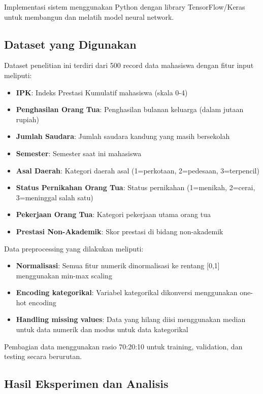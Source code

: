 \documentclass[10pt,a4paper]{article}
\begin{document}
Implementasi sistem menggunakan Python dengan library TensorFlow/Keras untuk membangun dan melatih model neural network.

\subsection{Dataset yang Digunakan}

Dataset penelitian ini terdiri dari 500 record data mahasiswa dengan fitur input meliputi:

\begin{itemize}
    \item \textbf{IPK}: Indeks Prestasi Kumulatif mahasiswa (skala 0-4)
    \item \textbf{Penghasilan Orang Tua}: Penghasilan bulanan keluarga (dalam jutaan rupiah)
    \item \textbf{Jumlah Saudara}: Jumlah saudara kandung yang masih bersekolah
    \item \textbf{Semester}: Semester saat ini mahasiswa
    \item \textbf{Asal Daerah}: Kategori daerah asal (1=perkotaan, 2=pedesaan, 3=terpencil)
    \item \textbf{Status Pernikahan Orang Tua}: Status pernikahan (1=menikah, 2=cerai, 3=meninggal salah satu)
    \item \textbf{Pekerjaan Orang Tua}: Kategori pekerjaan utama orang tua
    \item \textbf{Prestasi Non-Akademik}: Skor prestasi di bidang non-akademik
\end{itemize}

Data preprocessing yang dilakukan meliputi:
\begin{itemize}
    \item \textbf{Normalisasi}: Semua fitur numerik dinormalisasi ke rentang [0,1] menggunakan min-max scaling
    \item \textbf{Encoding kategorikal}: Variabel kategorikal dikonversi menggunakan one-hot encoding
    \item \textbf{Handling missing values}: Data yang hilang diisi menggunakan median untuk data numerik dan modus untuk data kategorikal
\end{itemize}

Pembagian data menggunakan rasio 70:20:10 untuk training, validation, dan testing secara berurutan.

\subsection{Hasil Eksperimen dan Analisis}
\end{document}
